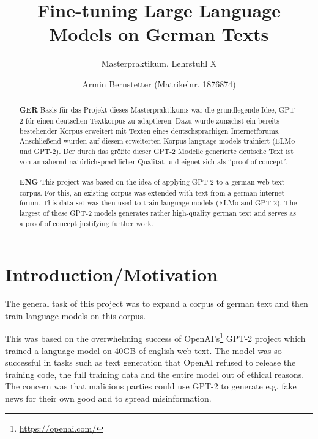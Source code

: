 \documentclass{scrartcl}
\begin{document}

\title{Fine-tuning Large Language Models on German Texts}
\subtitle{Masterpraktikum, Lehrstuhl X}

\author{Armin Bernstetter (Matrikelnr. 1876874)}

\maketitle

\begin{abstract}
\textbf{GER}
Basis für das Projekt dieses Masterpraktikums war die grundlegende Idee, GPT-2 für einen deutschen Textkorpus zu adaptieren. Dazu wurde zunächst ein bereits bestehender Korpus erweitert mit Texten eines deutschsprachigen Internetforums. Anschließend wurden auf diesem erweiterten Korpus language models trainiert (ELMo und GPT-2). Der durch das größte dieser GPT-2 Modelle generierte deutsche Text ist von annähernd natürlichsprachlicher Qualität und eignet sich als \enquote{proof of concept}.
\\\\
\textbf{ENG}
This project was based on the idea of applying GPT-2 to a german web text corpus. For this, an existing corpus was extended with text from a german internet forum. This data set was then used to train language models (ELMo and GPT-2). The largest of these GPT-2 models generates rather high-quality german text and serves as a proof of concept justifying further work.
\end{abstract}





\section{Introduction/Motivation}

The general task of this project was to expand a corpus of german text and then train language models on this corpus.


This was based on the overwhelming success of OpenAI's\footnote{\url{https://openai.com/}} GPT-2 project \cite{radford2019language} which trained a language model on 40GB of english web text. The model was so successful in tasks such as text generation that OpenAI refused to release the training code, the full training data and the entire model out of ethical reasons. The concern was that malicious parties could use GPT-2 to generate e.g. fake news for their own good and to spread misinformation.
\end{document}
